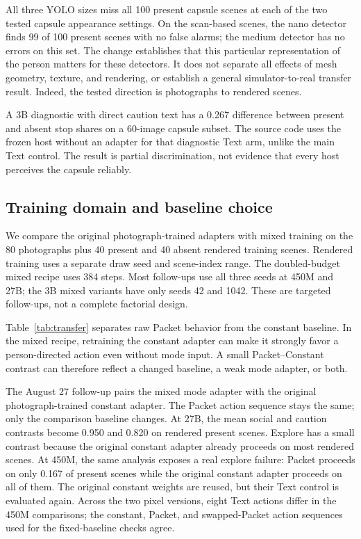 \documentclass[10pt]{article}
\begin{document}
All three YOLO sizes miss all 100 present capsule scenes at each
of the two tested capsule appearance settings. On the scan-based
scenes, the nano detector finds 99 of 100 present scenes with no
false alarms; the medium detector has no errors on this set.
The change establishes that this particular representation of the
person matters for these detectors. It does not separate all
effects of mesh geometry, texture, and rendering, or establish a
general simulator-to-real transfer result. Indeed, the tested
direction is photographs to rendered scenes.

A 3B diagnostic with direct caution text has a 0.267 difference
between present and absent stop shares on a 60-image capsule
subset. The source code uses the frozen host without an adapter
for that diagnostic Text arm, unlike the main Text control.
The result is partial discrimination, not evidence that every
host perceives the capsule reliably.

\subsection{Training domain and baseline choice}
We compare the original photograph-trained adapters with mixed
training on the 80 photographs plus 40 present and 40 absent
rendered training scenes. Rendered training uses a separate draw
seed and scene-index range. The doubled-budget mixed recipe uses
384 steps. Most follow-ups use all three seeds at 450M and 27B;
the 3B mixed variants have only seeds 42 and 1042. These are
targeted follow-ups, not a complete factorial design.

Table~\ref{tab:transfer} separates raw Packet behavior from the
constant baseline. In the mixed recipe, retraining the constant
adapter can make it strongly favor a person-directed action even
without mode input. A small Packet--Constant contrast can therefore
reflect a changed baseline, a weak mode adapter, or both.

The August 27 follow-up pairs the mixed mode adapter with the
original photograph-trained constant adapter. The Packet action
sequence stays the same; only the comparison baseline changes.
At 27B, the mean social and caution contrasts become 0.950 and
0.820 on rendered present scenes. Explore has a small contrast
because the original constant adapter already proceeds on most
rendered scenes. At 450M, the same analysis exposes a real explore
failure: Packet proceeds on only 0.167 of present scenes while
the original constant adapter proceeds on all of them. The original
constant weights are reused, but their Text control is evaluated
again. Across the two pixel versions, eight Text actions differ
in the 450M comparisons; the constant, Packet, and swapped-Packet
action sequences used for the fixed-baseline checks agree.
\end{document}

